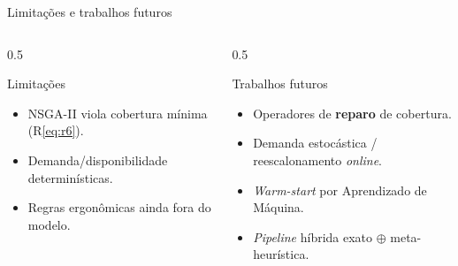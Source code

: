 \begin{frame}{Limitações e trabalhos futuros}
    \begin{columns}[T]
        \begin{column}{0.5\textwidth}
            \begingroup
            \begin{block}{Limitações}
                \begin{itemize}
                    \item NSGA-II viola cobertura mínima (R\ref{eq:r6}).
                    \item Demanda/disponibilidade determinísticas.
                    \item Regras ergonômicas ainda fora do modelo.
                \end{itemize}
            \end{block}
            \endgroup
        \end{column}
        \begin{column}{0.5\textwidth}
            \begin{block}{Trabalhos futuros}
                \begin{itemize}
                    \item Operadores de \textbf{reparo} de cobertura.
                    \item Demanda estocástica / reescalonamento \textit{online}.
                    \item \textit{Warm-start} por Aprendizado de Máquina.
                    \item \textit{Pipeline} híbrida exato $\oplus$ meta-heurística.
                \end{itemize}
            \end{block}
        \end{column}
    \end{columns}
\end{frame}
